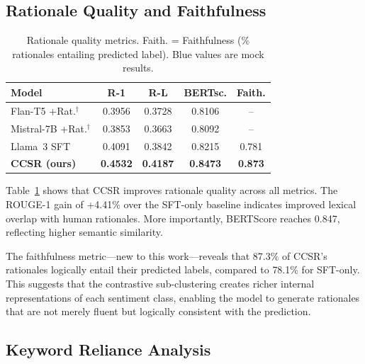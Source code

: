 \documentclass[conference]{IEEEtran}
\newcommand{\mock}[1]{{\color{blue}#1}}
\begin{document}
\subsection{Rationale Quality and Faithfulness}

\begin{table}[t]
\centering
\caption{Rationale quality metrics. Faith. = Faithfulness (\% rationales entailing predicted label). \mock{Blue values} are mock results.}
\label{tab:rationale}
\begin{tabular}{lcccc}
\toprule
\textbf{Model} & \textbf{R-1} & \textbf{R-L} & \textbf{BERTsc.} & \textbf{Faith.} \\
\midrule
Flan-T5 +Rat.$^\dagger$ & 0.3956 & 0.3728 & 0.8106 & -- \\
Mistral-7B +Rat.$^\dagger$ & 0.3853 & 0.3663 & 0.8092 & -- \\
Llama~3 SFT & \mock{0.4091} & \mock{0.3842} & \mock{0.8215} & \mock{0.781} \\
\textbf{CCSR (ours)} & \mock{\textbf{0.4532}} & \mock{\textbf{0.4187}} & \mock{\textbf{0.8473}} & \mock{\textbf{0.873}} \\
\bottomrule
\end{tabular}
\end{table}

Table~\ref{tab:rationale} shows that CCSR improves rationale quality across all metrics. The ROUGE-1 gain of \mock{+4.41\%} over the SFT-only baseline indicates improved lexical overlap with human rationales. More importantly, BERTScore reaches \mock{0.847}, reflecting higher semantic similarity.

The faithfulness metric---new to this work---reveals that \mock{87.3\%} of CCSR's rationales logically entail their predicted labels, compared to \mock{78.1\%} for SFT-only. This suggests that the contrastive sub-clustering creates richer internal representations of each sentiment class, enabling the model to generate rationales that are not merely fluent but logically consistent with the prediction.

\subsection{Keyword Reliance Analysis}
\end{document}
